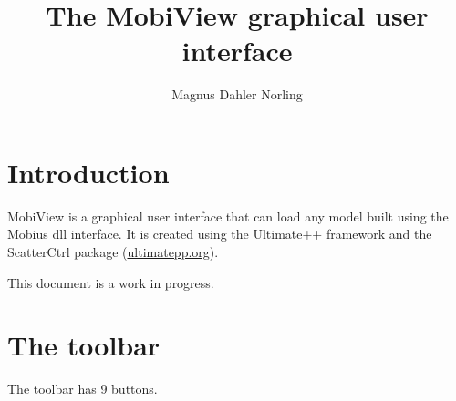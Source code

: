 \documentclass[11pt]{article}
\title{The MobiView graphical user interface}
\author{Magnus Dahler Norling}
\theoremstyle{definition}
\begin{document}
\maketitle

\tableofcontents

\section{Introduction}

MobiView is a graphical user interface that can load any model built using the Mobius dll interface. It is created using the Ultimate++ framework and the ScatterCtrl package (\url{ultimatepp.org}).

This document is a work in progress.

\section{The toolbar}

The toolbar has 9 buttons.
\end{document}
